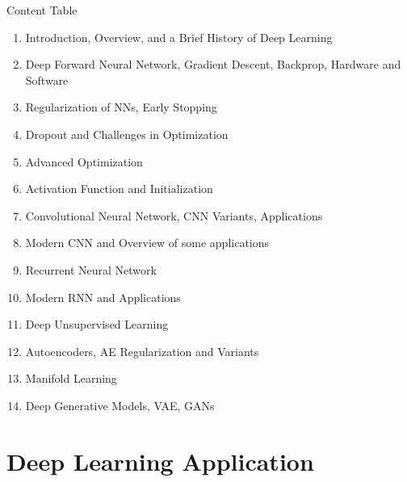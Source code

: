 \begin{frame}  {Content Table}

\begin{enumerate}
\item Introduction, Overview, and a Brief History of Deep Learning

\item Deep Forward Neural Network, Gradient Descent, Backprop, Hardware and Software

\item Regularization of NNs, Early Stopping

\item Dropout and Challenges in Optimization

\item Advanced Optimization

\item Activation Function and Initialization

\item Convolutional Neural Network, CNN Variants, Applications

\item  Modern CNN and Overview of some applications

\item Recurrent Neural Network

\item Modern RNN and Applications

\item Deep Unsupervised Learning

\item Autoencoders, AE Regularization and Variants

\item Manifold Learning

\item Deep Generative Models, VAE, GANs

\end{enumerate}
    
  
\end{frame}


\section{Deep Learning Application}

